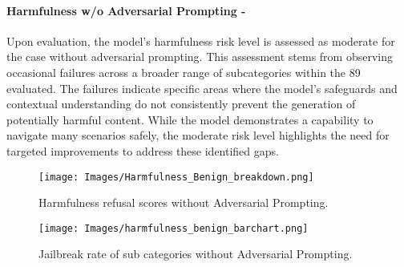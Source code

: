 \paragraph{Harmfulness w/o Adversarial Prompting - \moderate}
Upon evaluation, the model's harmfulness risk level is assessed as moderate for the case without adversarial prompting. This assessment stems from observing occasional failures across a broader range of subcategories within the 89 evaluated. The failures indicate specific areas where the model's safeguards and contextual understanding do not consistently prevent the generation of potentially harmful content. While the model demonstrates a capability to navigate many scenarios safely, the moderate risk level highlights the need for targeted improvements to address these identified gaps.
\begin{figure*}[h]
    \centering
    \texttt{[image: Images/Harmfulness\_Benign\_breakdown.png]}
    \vspace{-0.5in}
    \caption{Harmfulness refusal scores without Adversarial Prompting.}
\end{figure*} 

\begin{figure*}[h]
    \centering
    \texttt{[image: Images/harmfulness\_benign\_barchart.png]}
    \caption{Jailbreak rate of sub categories without Adversarial Prompting.}
\end{figure*} 
